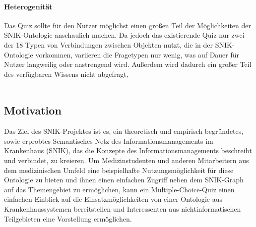 \documentclass[headsepline,titlepage,ngerman,twoside,12pt]{report}
\newcommand\todo[1]{}%
\begin{document}
\paragraph{Heterogenität}
Das Quiz sollte für den Nutzer möglichst einen großen Teil der Möglichkeiten der SNIK-Ontologie anschaulich machen.
Da jedoch das existierende Quiz nur zwei der 18 Typen von Verbindungen zwischen Objekten nutzt, die in der SNIK-Ontologie vorkommen, variieren die Fragetypen nur wenig, was auf Dauer für Nutzer langweilig oder anstrengend wird. Außerdem wird dadurch ein großer Teil des verfügbaren Wissens nicht abgefragt,
\\\\\todo{
\begin{itemize}
\item Worin bestehen die Probleme?
\item Warum ist die geschilderte vorliegende Situation problematisch?
\item Für wen ist sie problematisch?
\end{itemize}
Aus den Papers bzw. dem Antrag des Forschungsprojektes entnehmen.\\
}\todo{
Hier ist auf die generelle Problemlage einzugehen, die dem Aufsatz im Wissenschaftsfeld zu Grunde liegt.\\
Bsp.: Daten aus der Krankenversorgung stehen aus rechtlichen und technischen Gründen nicht für die Forschung zur Verfügung, sodass klinische Forscher eigene Datenerhebungen planen müssen.
}
\subsection{Motivation}
\label{sub:Motivation}
Das Ziel des SNIK-Projektes ist es, ein theoretisch und empirisch begründetes, sowie erprobtes Semantisches Netz des Informationsmanagements im Krankenhaus (SNIK), das die Konzepte des Informationsmanagements beschreibt und verbindet, zu kreieren.
Um Medizinstudenten und anderen Mitarbeitern aus dem medizinischen Umfeld eine beispielhafte Nutzungsmöglichkeit für diese Ontologie zu bieten und ihnen einen einfachen Zugriff neben dem SNIK-Graph auf das Themengebiet zu ermöglichen, kann ein Multiple-Choice-Quiz einen einfachen Einblick auf die Einsatzmöglichkeiten von einer Ontologie aus Krankenhaussystemen bereitstellen und Interessenten aus nichtinformatischen Teilgebieten eine Vorstellung ermöglichen.
\end{document}
